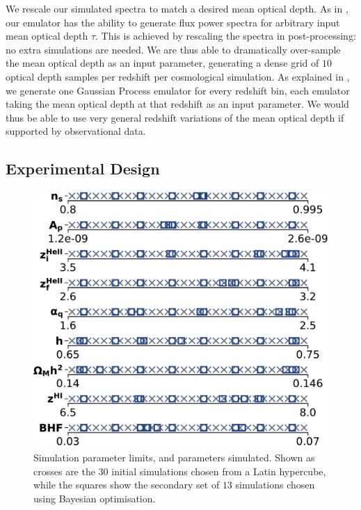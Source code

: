 \documentclass[a4paper,11pt]{article}
\begin{document}
We rescale our simulated spectra to match a desired mean optical depth. As in \cite{Bird:2019}, our emulator has the ability to generate flux power spectra for arbitrary input mean optical depth $\tau$. This is achieved by rescaling the spectra in post-processing: no extra simulations are needed. We are thus able to dramatically over-sample the mean optical depth as an input parameter, generating a dense grid of $10$ optical depth samples per redshift per cosmological simulation. As explained in \cite{Bird:2019}, we generate one Gaussian Process emulator for every redshift bin, each emulator taking the mean optical depth at that redshift as an input parameter. We would thus be able to use very general redshift variations of the mean optical depth if supported by observational data.



\subsection{Experimental Design}
\label{sec:latinhypercube}

\begin{figure}
    \centering
	\includegraphics[width=0.5\columnwidth]{figures/120box_42samples.pdf}
    \caption{Simulation parameter limits, and parameters simulated. Shown as crosses are the $30$ initial simulations chosen from a Latin hypercube, while the squares show the secondary set of $13$ simulations chosen using Bayesian optimisation.
    }
    \label{fig:samples}
\end{figure}

\end{document}
